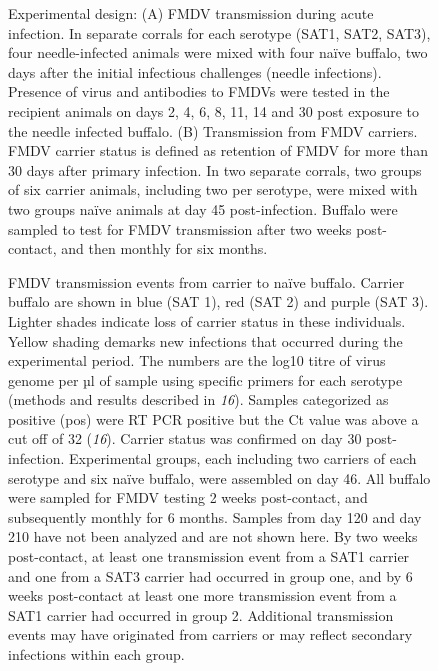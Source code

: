\documentclass[12pt, USenglish]{article}  %
\begin{document}
\begin{figure}
  \centering
  \caption{Experimental design: (A) FMDV transmission during acute infection. In separate corrals for each serotype (SAT1, SAT2, SAT3), four needle-infected animals were mixed with four naïve buffalo, two days after the initial infectious challenges (needle infections). Presence of virus and antibodies to FMDVs were tested in the recipient animals on days 2, 4, 6, 8, 11, 14 and 30 post exposure to the needle infected buffalo. (B) Transmission from FMDV carriers. FMDV carrier status is defined as retention of FMDV for more than 30 days after primary infection. In two separate corrals, two groups of six carrier animals, including two per serotype, were mixed with two groups naïve animals at day 45 post-infection. Buffalo were sampled to test for FMDV transmission after two weeks post-contact, and then monthly for six months.}
\end{figure}

\begin{figure}
  \centering
  \caption{FMDV transmission events from carrier to naïve
    buffalo. Carrier buffalo are shown in blue (SAT 1), red (SAT 2)
    and purple (SAT 3). Lighter shades indicate loss of carrier status
    in these individuals. Yellow shading demarks new infections that
    occurred during the experimental period. The numbers are the log10
    titre of virus genome per \unit{µl} of sample using specific
    primers for each serotype (methods and results described in
    \textit{16}). Samples categorized as positive (pos) were RT PCR
    positive but the Ct value was above a cut off of 32
    (\textit{16}). Carrier status was confirmed on day 30
    post-infection. Experimental groups, each including two carriers
    of each serotype and six naïve buffalo, were assembled on day
    46. All buffalo were sampled for FMDV testing 2 weeks
    post-contact, and subsequently monthly for 6 months. Samples from
    day 120 and day 210 have not been analyzed and are not shown
    here. By two weeks post-contact, at least one transmission event
    from a SAT1 carrier and one from a SAT3 carrier had occurred in
    group one, and by 6 weeks post-contact at least one more
    transmission event from a SAT1 carrier had occurred in group
    2. Additional transmission events may have originated from
    carriers or may reflect secondary infections within each group.}
\end{figure}
\end{document}
